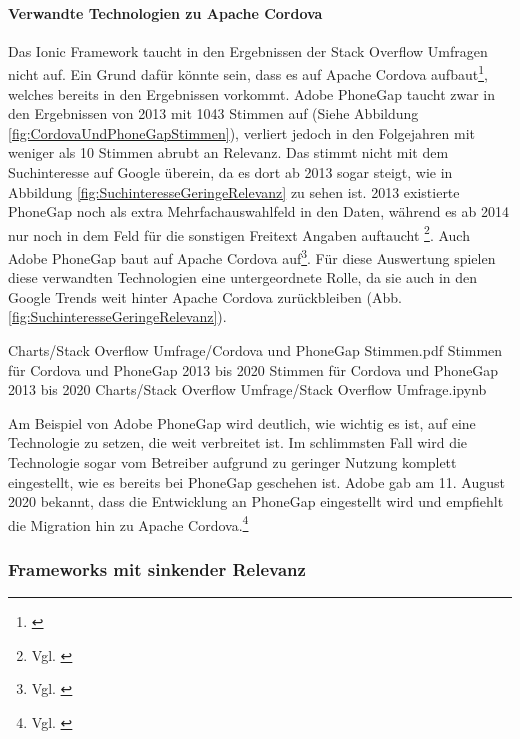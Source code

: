 \paragraph{Verwandte Technologien zu Apache Cordova} Das Ionic Framework taucht in den Ergebnissen der Stack Overflow Umfragen nicht auf. Ein Grund dafür könnte sein, dass es auf Apache Cordova aufbaut\footnote{\cite{TheLastWordOnCordovaAndPhoneGap}}, welches bereits in den Ergebnissen vorkommt. Adobe PhoneGap taucht zwar in den Ergebnissen von 2013 mit 1043 Stimmen auf (Siehe Abbildung \ref{fig:CordovaUndPhoneGapStimmen}), verliert jedoch in den Folgejahren mit weniger als 10 Stimmen abrubt an Relevanz.  Das stimmt nicht mit dem Suchinteresse auf Google überein, da es dort ab 2013 sogar steigt, wie in Abbildung \ref{fig:SuchinteresseGeringeRelevanz} zu sehen ist. 2013 existierte PhoneGap noch als extra Mehrfachauswahlfeld in den Daten, während es ab 2014 nur noch in dem Feld für die sonstigen Freitext Angaben auftaucht \footnote{Vgl. \cite{StackOverflowInsights}}. Auch Adobe PhoneGap baut auf Apache Cordova auf\footnote{Vgl. \cite{FaqPhoneGapDocs}}. Für diese Auswertung spielen diese verwandten Technologien eine untergeordnete Rolle, da sie auch in den Google Trends weit hinter Apache Cordova zurückbleiben (Abb. \ref{fig:SuchinteresseGeringeRelevanz}).

\begin{alexfigurewithnotebook}{Charts/Stack Overflow Umfrage/Cordova und PhoneGap Stimmen.pdf}
	{Stimmen für Cordova und PhoneGap 2013 bis 2020}
	{Stimmen für Cordova und PhoneGap 2013 bis 2020}
	{Charts/Stack Overflow Umfrage/Stack Overflow Umfrage.ipynb}
	{}
	\label{fig:CordovaUndPhoneGapStimmen}

\end{alexfigurewithnotebook}

Am Beispiel von Adobe PhoneGap wird deutlich, wie wichtig es ist, auf eine Technologie zu setzen, die weit verbreitet ist. Im schlimmsten Fall wird die Technologie sogar vom Betreiber aufgrund zu geringer Nutzung komplett eingestellt, wie es bereits bei PhoneGap geschehen ist. Adobe gab am 11. August 2020 bekannt, dass die  Entwicklung an PhoneGap eingestellt wird und empfiehlt die Migration hin zu Apache Cordova.\footnote{Vgl. \cite{UpdateForCustomersUsingPhoneGapAndPhoneGapBuild}}

\subsubsection{Frameworks mit sinkender Relevanz}

